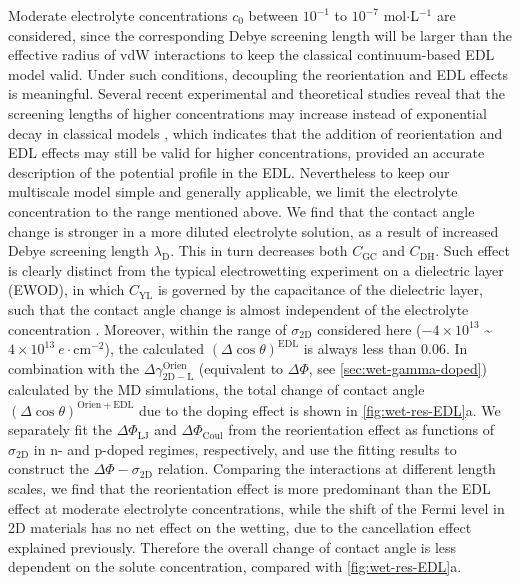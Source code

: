 Moderate electrolyte
concentrations \(c_{0}\) between \(10^{-1}\) to \(10^{-7}\)
mol\(\cdot\)L\(^{-1}\) are considered, since the corresponding Debye
screening length will be larger than the effective radius of vdW
interactions to keep the classical continuum-based EDL model valid.
Under such conditions, decoupling the reorientation and EDL effects is
meaningful.
%
Several recent experimental and theoretical studies reveal that
the screening lengths of higher concentrations may increase instead of
exponential decay in classical models
\cite{Smith_2016_screening,Lee_2017_scaling}, which indicates that the
addition of reorientation and EDL effects may still be valid for
higher concentrations, provided an accurate description of the
potential profile in the EDL. Nevertheless to keep our multiscale
model simple and generally applicable, we limit the electrolyte
concentration to the range mentioned above.
We find that the contact angle change is stronger in a
more diluted electrolyte solution, as a result of  increased Debye
screening length \(\lambda_{\mathrm{D}}\). This in turn decreases
both \(C_{\mathrm{GC}}\) and \(C_{\mathrm{DH}}\).
%
Such effect is clearly distinct from the typical electrowetting
experiment on a dielectric layer (EWOD), in
which \(C_{\mathrm{YL}}\) is governed by the capacitance of the
dielectric layer, such that the contact angle change is almost independent of
the electrolyte concentration \cite{Mugele_2005_EW_rev}.
%
Moreover, within the range of \(\sigma_{\mathrm{2D}}\) considered here
(\(-4\times10^{13}\) \textasciitilde{}
\(4\times10^{13}\ e\cdot \mathrm{cm}^{-2}\)), the calculated
\((\Delta \cos \theta)^{\mathrm{EDL}}\) is always less than 0.06.  In
combination with the
\(\Delta \gamma^{\mathrm{Orien}}_{\mathrm{2D-L}}\) (equivalent to
\(\Delta \Phi\), see \autoref{sec:wet-gamma-doped}) calculated by the
MD simulations, the total change of contact angle
\((\Delta \cos \theta)^{\mathrm{Orien + EDL}}\) due to the doping
effect is shown in \autoref{fig:wet-res-EDL}a. We separately fit the
\(\Delta \Phi_{\mathrm{LJ}}\) and \(\Delta \Phi_{\mathrm{Coul}}\) from
the reorientation effect as functions of \(\sigma_{\mathrm{2D}}\) in
n- and p-doped regimes, respectively, and use the fitting results to
construct the \(\Delta \Phi-\sigma_{\mathrm{2D}}\) relation. Comparing
the interactions at different length scales, we find that the
reorientation effect is more predominant than the EDL effect at
moderate electrolyte concentrations, while the shift of the Fermi
level in 2D materials has no net effect on the wetting, due to the
cancellation effect explained previously. Therefore the overall change
of contact angle is less dependent on the solute concentration,
compared with \autoref{fig:wet-res-EDL}a.

